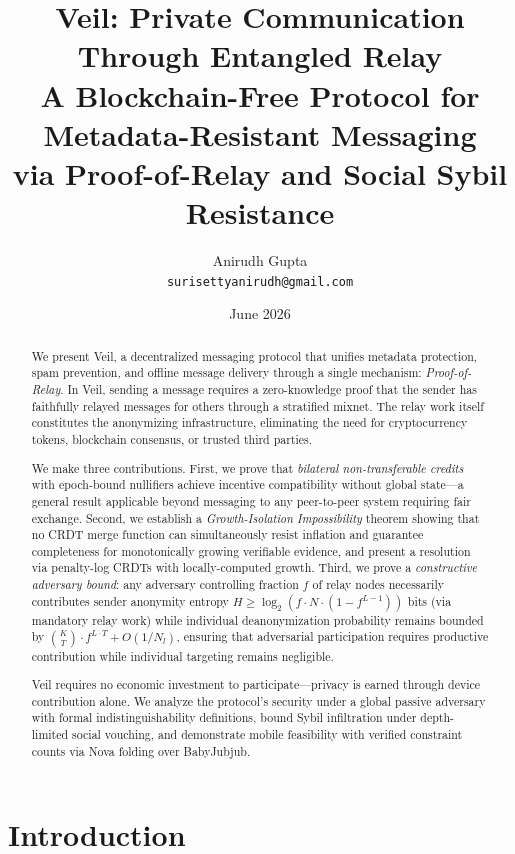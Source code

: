 \documentclass[11pt,a4paper]{article}
\title{\textbf{Veil: Private Communication Through Entangled Relay} \\[0.5em]
\large A Blockchain-Free Protocol for Metadata-Resistant Messaging \\
via Proof-of-Relay and Social Sybil Resistance}
\author{Anirudh Gupta \\ \texttt{surisettyanirudh@gmail.com}}
\date{June 2026}
\begin{document}
\maketitle


\begin{abstract}
We present Veil, a decentralized messaging protocol that unifies metadata protection, spam prevention, and offline message delivery through a single mechanism: \emph{Proof-of-Relay}. In Veil, sending a message requires a zero-knowledge proof that the sender has faithfully relayed messages for others through a stratified mixnet. The relay work itself constitutes the anonymizing infrastructure, eliminating the need for cryptocurrency tokens, blockchain consensus, or trusted third parties.

We make three contributions. First, we prove that \emph{bilateral non-transferable credits} with epoch-bound nullifiers achieve incentive compatibility without global state---a general result applicable beyond messaging to any peer-to-peer system requiring fair exchange. Second, we establish a \emph{Growth-Isolation Impossibility} theorem showing that no CRDT merge function can simultaneously resist inflation and guarantee completeness for monotonically growing verifiable evidence, and present a resolution via penalty-log CRDTs with locally-computed growth. Third, we prove a \emph{constructive adversary bound}: any adversary controlling fraction $f$ of relay nodes necessarily contributes sender anonymity entropy $H \geq \log_2(f \cdot N \cdot (1 - f^{L-1}))$ bits (via mandatory relay work) while individual deanonymization probability remains bounded by $\binom{K}{T} \cdot f^{L \cdot T} + O(1/N_l)$, ensuring that adversarial participation requires productive contribution while individual targeting remains negligible.

Veil requires no economic investment to participate---privacy is earned through device contribution alone. We analyze the protocol's security under a global passive adversary with formal indistinguishability definitions, bound Sybil infiltration under depth-limited social vouching, and demonstrate mobile feasibility with verified constraint counts via Nova folding over BabyJubjub.
\end{abstract}

\section{Introduction}
\label{sec:intro}
\end{document}
